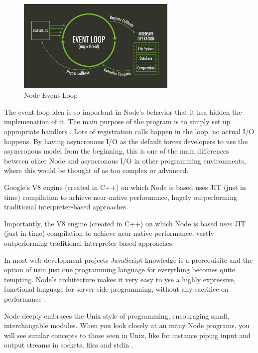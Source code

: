 \documentclass[12pt]{article} %
\begin{document}
\begin{figure} %
  \begin{center}
    \includegraphics[width=0.68\textwidth]{loop}
  \end{center}
  \caption{Node Event Loop}
\end{figure}

The event loop idea is so important in Node's behavior  that it hsa hidden the implemenation of it.
The main purpose of the program is to simply set up appropriate handlers \cite{4}.
Lots of registration calls happen in the loop, no actual I/O happens.
By having asyncronous I/O as the default forces developers to use the asyncronous model from the beginning, this is one of the main differences between other Node and asyncronous I/O in other programming environments, where this would be thought of as too complex or advanced.

Google's V8 engine (created in C++) on which Node is based uses JIT (just in time) compilation to achieve near-native performance, hugely outperforming traditional interpreter-based approaches\cite{1}.

Importantly, the V8 engine (created in C++) on which Node is based uses JIT (just in time) compilation to achieve near-native performance, vastly outperforming traditional interpreter-based approaches\cite{1}.

In most web development projects JavaScript knowledge is a prerequisite  and the option of usin just one programming language for everything becomes quite tempting. Node's architecture makes it very easy to yse a highly expressive, functional language for server-side programming, without any sacrifice on performance \cite{4}.

Node deeply embraces the Unix style of programming, encouraging small, interchangable modules.
When you look closely at an many Node programs, you will see similar concepts to those seen in Unix, like for instance piping input and output streams in sockets, files and stdin \cite{1}. 
\end{document}
